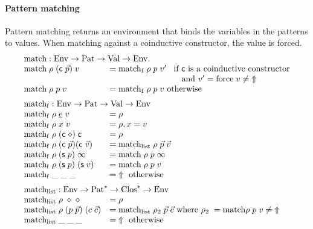 \paragraph*{Pattern matching}
Pattern matching returns an environment that binds the variables in the patterns to values.
When matching against a coinductive constructor, the value is forced.
\[
\begin{array}{ll}
\multicolumn{2}{l}{\match : \Env \ra \Pat \ra \Val \ra \Env}\\
\match \; \rho \; (\cc \; \vec{p}) \; v & = \matchf \; \rho \; p \; v' \spc \mbox{if  } \cc  \mbox{ is a coinductive constructor}\\
& \spcx \spcx \spcx \mbox{and } v' = \forc \; v \neq \stuck \\
\match \; \rho \; p \; v & = \matchf \; \rho \; p \; v \mbox{ otherwise}
\vs\\
\multicolumn{2}{l}{\matchf : \Env \ra \Pat \ra \Val \ra \Env}\\
\matchf \; \rho \; \inacc{e} \; v & = \rho \\
\matchf \; \rho \; x \; v & = \ins{\rho}{x}{v} \\
\matchf \; \rho \; (\cc \; \diamond) \; \cc & = \rho \\
\matchf \; \rho \; (\cc \; \vec{p}) (\cc \; \vec{v}) & = \matchList \; \rho \; \vec{p} \; \vec{v} \\
\matchf \; \rho \; (\s p) \; \infty & = \match \; \rho \; p \; \infty \\
\matchf \; \rho \; (\s p) \; (\s v) & = \match \; \rho \; p \; v \\
\matchf \; \_ \; \_ \; \_ & = \stuck \mbox{ otherwise}
\vs\\
\multicolumn{2}{l}{\matchList : \Env \ra \ves{\Pat} \ra \ves{\Clos} \ra \Env }\\
\matchList \; \rho \; \diamond \; \diamond & = \rho \\
\matchList \; \rho \; (p \; \vec{p}) \; (c \; \vec{c}) & = \matchList \; \rho_2 \; \vec{p} \; \vec{c} \mbox{ where } \rho_2 \; = \match \rho \; p \; v \neq \stuck \\
\matchList \; \_ \; \_ \; \_ & = \stuck \mbox { otherwise } \\
\end{array}
\]

